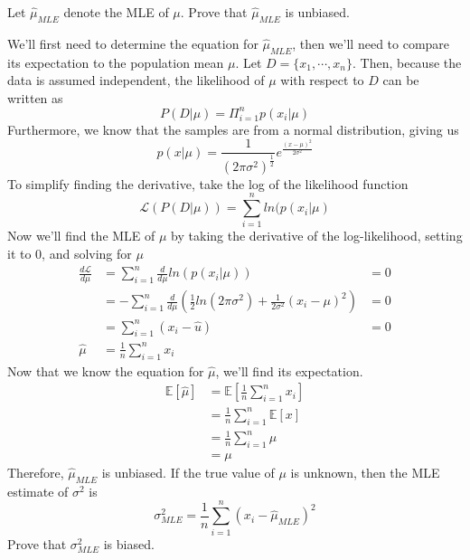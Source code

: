 \documentclass[11pt,largemargins]{homework}
\begin{document}
\begin{alphaparts}
	\questionpart Let $\hat{\mu}_{MLE}$ denote the MLE of $\mu$. Prove that $\hat{\mu}_{MLE}$ is unbiased.

	We'll first need to determine the equation for $\hat{\mu}_{MLE}$, then we'll need to compare its expectation to the population mean $\mu$.
	Let $D = \{x_1, \cdots,x_n\}$. Then, because the data is assumed independent, the likelihood of $\mu$ with respect to $D$ can be written as
	$$P(D|\mu)=\Pi_{i=1}^np(x_i|\mu)$$
	Furthermore, we know that the samples are from a normal distribution, giving us
	$$p(x|\mu) = \frac{1}{(2\pi\sigma^2)^{\frac{1}{2}}}e^\frac{(x-\mu)^2}{2\sigma^2}$$
	To simplify finding the derivative, take the log of the likelihood function
	$$\mathcal{L}(P(D|\mu))=\sum_{i=1}^{n}ln(p(x_i|\mu)$$
	Now we'll find the MLE of $\mu$ by taking the derivative of the log-likelihood, setting it to 0, and solving for $\mu$
	\begin{align*}
		\frac{d\mathcal{L}}{d\mu}&=\sum_{i=1}^{n}\frac{d}{d\mu}ln(p(x_i|\mu))&=0\\
		&=-\sum_{i=1}^{n}\frac{d}{d\mu}\left( \frac{1}{2}ln(2\pi\sigma^2)+\frac{1}{2\sigma^2}{(x_i-\mu)^2}\right)&=0\\
		&= \sum_{i=1}^{n}(x_i-\hat{u})&=0\\
		\hat{\mu}&=\frac{1}{n}\sum_{i=1}^{n}x_i
	\end{align*}
	Now that we know the equation for $\hat{\mu}$, we'll find its expectation.
	\begin{align*}
		\mathbb{E}[\hat{\mu}] &= \mathbb{E}\left[\frac{1}{n}\sum_{i=1}^{n}x_i\right]\\
		&= \frac{1}{n}\sum_{i=1}^{n}\mathbb{E}[x]\\
		&= \frac{1}{n}\sum_{i=1}^{n}\mu\\
		&= \mu
	\end{align*}
	Therefore, $\hat{\mu}_{MLE}$ is unbiased.
	\questionpart If the true value of $\mu$ is unknown, then the MLE estimate of $\sigma^2$ is
	$$\sigma^2_{MLE}=\frac{1}{n}\sum_{i=1}^{n}{(x_i-\hat{\mu}_{MLE})}^2$$
	Prove that $\sigma^2_{MLE}$ is biased.


\end{alphaparts}
\end{document}
